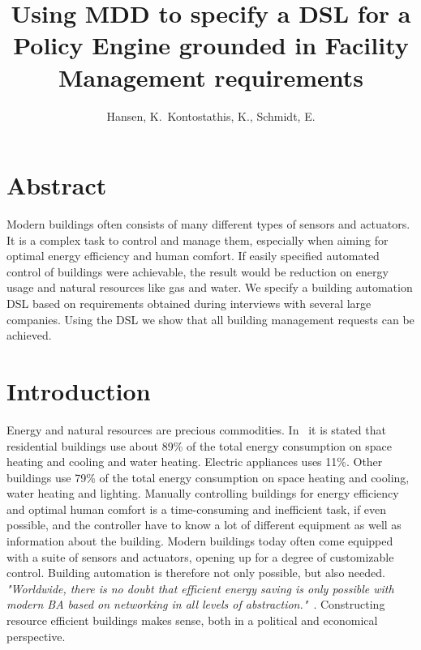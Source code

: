 \documentclass{llncs}
\begin{document}
\frontmatter
\pagestyle{headings}
\title{Using MDD to specify a DSL for a Policy Engine grounded in Facility Management requirements}
\author{Hansen, K.\, Kontostathis, K., Schmidt, E.}
\maketitle

\section{Abstract}
Modern buildings often consists of many different types of sensors and actuators. It is a complex task to control and manage them, especially when aiming for optimal energy efficiency and human comfort. If easily specified automated control of buildings were achievable, the result would be reduction on energy usage and natural resources like gas and water. We specify a building automation DSL based on requirements obtained during interviews with several large companies. Using the DSL we show that all building management requests can be achieved.

\section{Introduction}
Energy and natural resources are precious commodities. In~\cite{janssen2004towards} it is stated that residential buildings use about 89\% of the total energy consumption on space heating and cooling and water heating. Electric appliances uses 11\%. Other buildings use 79\% of the total energy consumption on space heating and cooling, water heating and lighting. Manually controlling buildings for energy efficiency and optimal human comfort is a time-consuming and inefficient task, if even possible, and the controller have to know a lot of different equipment as well as information about the building. Modern buildings today often come equipped with a suite of sensors and actuators, opening up for a degree of customizable control. Building automation is therefore not only possible, but also needed. \textit{"Worldwide, there is no doubt that efficient energy saving is only possible with modern BA based on networking in all levels of abstraction."}~\cite{dietrich2010communication}. Constructing resource efficient buildings makes sense, both in a political and economical perspective. 
\end{document}
